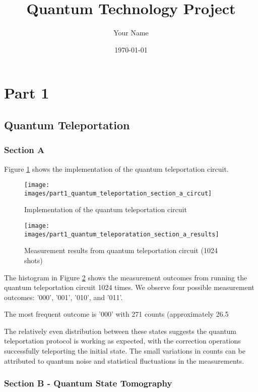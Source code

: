 \documentclass[12pt,a4paper]{article}
\title{Quantum Technology Project}
\author{Your Name}
\date{\today}
\begin{document}
\maketitle

\section{Part 1}

\subsection{Quantum Teleportation}

\subsubsection{Section A}
Figure \ref{fig:teleportation_circuit} shows the implementation of the quantum teleportation circuit.

\begin{figure}[h]
\centering
\texttt{[image: images/part1\_quantum\_teleportation\_section\_a\_circut]}
\caption{Implementation of the quantum teleportation circuit}
\label{fig:teleportation_circuit}
\end{figure}

\begin{figure}[h]
\centering
\texttt{[image: images/part1\_quantum\_teleporatation\_section\_a\_results]}
\caption{Measurement results from quantum teleportation circuit (1024 shots)}
\label{fig:teleportation_results}
\end{figure}

The histogram in Figure \ref{fig:teleportation_results} shows the measurement outcomes from running the quantum teleportation circuit 1024 times. We observe four possible measurement outcomes: '000', '001', '010', and '011'.

The most frequent outcome is '000' with 271 counts (approximately 26.5%

The relatively even distribution between these states suggests the quantum teleportation protocol is working as expected, with the correction operations successfully teleporting the initial state. The small variations in counts can be attributed to quantum noise and statistical fluctuations in the measurements.


\subsubsection{Section B - Quantum State Tomography}
\end{document}
